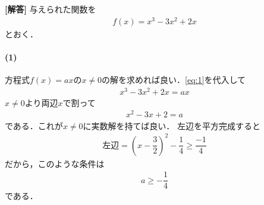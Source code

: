 \documentclass[../../main.tex]{subfiles}
\begin{document}
\begin{oframed}
  
\end{oframed}

{\bf [解答]}
与えられた関数を
\begin{align}
  f(x)=x^3-3x^2+2x \label{eq:1}
\end{align}
とおく．

\paragraph{(1)}

方程式$f(x)=ax$の$x\neq 0$の解を求めれば良い．\cref{eq:1}を代入して
\begin{align}
  x^3-3x^2+2x = ax
\end{align}
$x\neq 0$より両辺$x$で割って
\begin{align}
  x^2-3x+2=a \label{eq:2}
\end{align}
である．これが$x \neq 0$に実数解を持てば良い．
左辺を平方完成すると
\begin{align}
  \text{左辺} = \left(x-\dfrac{3}{2}\right)^2-\dfrac{1}{4} \ge \dfrac{-1}{4}
\end{align}
だから，このような条件は
\begin{align}
  a\ge-\dfrac{1}{4} \label{eq:3}
\end{align}
である．
\end{document}
